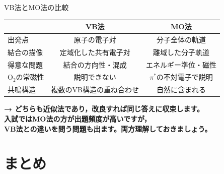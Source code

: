 \documentclass[aspectratio=169, 11pt]{beamer}
\newcommand{\teacher}[1]{{\color{darkblue}\textbf{→ #1}}}
\begin{document}
\begin{frame}{VB法とMO法の比較}

\begin{center}
\begin{tabular}{lcc}
  \toprule
  & \textbf{VB法} & \textbf{MO法} \\
  \midrule
  出発点 & 原子の電子対 & 分子全体の軌道 \\
  結合の描像 & 定域化した共有電子対 & 離域した分子軌道 \\
  得意な問題 & 結合の方向性・混成 & エネルギー準位・磁性 \\
  $\mathrm{O}_2$の常磁性 & \alert{説明できない} & $\pi^*$の不対電子で説明 \\
  共鳴構造 & 複数のVB構造の重ね合わせ & 自然に含まれる \\
  \bottomrule
\end{tabular}
\end{center}

\vspace{0.3em}
\teacher{どちらも近似法であり，改良すれば同じ答えに収束します。\\
入試ではMO法の方が出題頻度が高いですが，\\
VB法との違いを問う問題も出ます。両方理解しておきましょう。}
\end{frame}

\section{まとめ}
\end{document}
